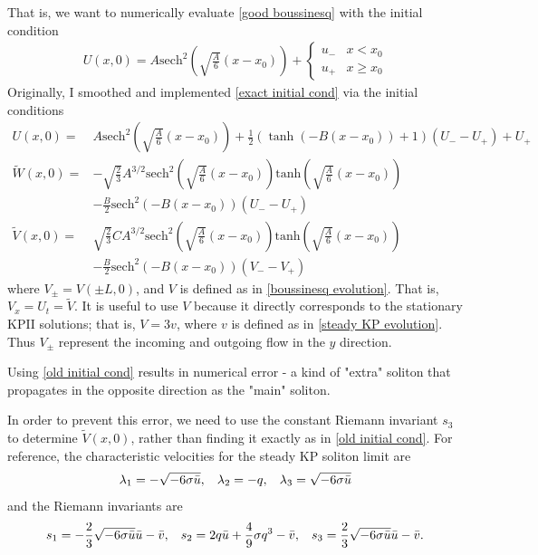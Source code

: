 \documentclass[12pt]{article}
\newcommand{\sech}[0]{\mathrm{sech}}
\numberwithin{equation}{section}
\begin{document}
That is, we want to numerically evaluate \eqref{good boussinesq} with the initial condition
\begin{align}
    U(x,0) = A\sech^2\left(\sqrt{\frac{A}{6}}(x-x_0)\right) + \left\{
    \begin{array}{cc}
        u_- & x<x_0 \\
        u_+ & x\geq x_0
    \end{array}\right. \label{exact initial cond}
\end{align}
Originally, I smoothed and implemented \eqref{exact initial cond} via the initial conditions
\begin{subequations}
    \begin{align}
         U(x,0) =& A\sech^2\left(\sqrt{\frac{A}{6}}(x-x_0)\right) + \frac{1}{2}\left(\tanh\left(-B(x-x_0)\right) + 1\right)(U_--U_+) + U_+ \\
          \tilde{W}(x,0) =& -\sqrt{\frac{2}{3}}A^{3/2}\sech^2\left(\sqrt{\frac{A}{6}}(x-x_0)\right)\mathrm{tanh}\left(\sqrt{\frac{A}{6}}(x-x_0)\right) \nonumber \\
          & -\frac{B}{2}\sech^2\left(-B(x-x_0)\right)(U_--U_+) \\
        \tilde{V}(x,0) =& \sqrt{\frac{2}{3}}CA^{3/2}\sech^2\left(\sqrt{\frac{A}{6}}(x-x_0)\right)\mathrm{tanh}\left(\sqrt{\frac{A}{6}}(x-x_0)\right) \nonumber \\
          & -\frac{B}{2}\sech^2\left(-B(x-x_0)\right)(V_- -V_+) 
    \end{align} \label{old initial cond}
\end{subequations}
where $V_{\pm} = V(\pm L,0)$, and $V$ is defined as in \eqref{boussinesq evolution}. That is, $V_x = U_t = \tilde{V}$. It is useful to use $V$ because it directly corresponds to the stationary KPII solutions; that is, $V = 3v$, where $v$ is defined as in \eqref{steady KP evolution}. Thus $V_{\pm}$ represent the incoming and outgoing flow in the $y$ direction.

Using \eqref{old initial cond} results in numerical error - a kind of "extra" soliton that propagates in the opposite direction as the "main" soliton.

In order to prevent this error, we need to use the constant Riemann invariant $s_3$ to determine $\tilde{V}(x,0)$, rather than finding it exactly as in \eqref{old initial cond}. For reference, the characteristic velocities for the steady KP soliton limit are
    \begin{align}
        \lambda_1 = -\sqrt{-6\sigma \bar u}, \hspace{3mm}
        \lambda_2 = -q, \hspace{3mm}
        \lambda_3 = \sqrt{-6\sigma \bar u}
        \end{align}
and the Riemann invariants are
    \begin{align}
        s_{1} = -\frac{2}{3}\sqrt{-6\sigma \bar u}\bar u - \bar v, \hspace{3mm}
        s_{2}= 2q\bar u + \frac{4}{9}\sigma q^3 - \bar v, \hspace{3mm}
        s_{3} = \frac{2}{3}\sqrt{-6\sigma \bar u}\bar u - \bar v.
    \end{align}
\end{document}
